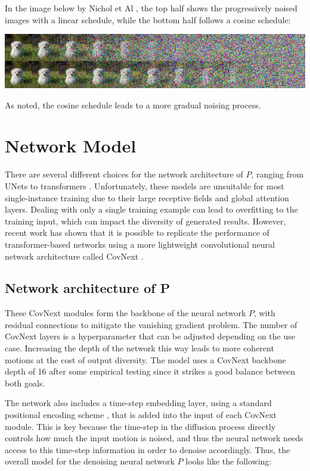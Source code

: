 \documentclass[a4paper, 12pt]{report}
\begin{document}
In the image below by Nichol et Al \cite{nichol_improved_2021}, the top half shows the progressively noised images with a linear schedule, while the bottom half follows a cosine schedule:

\includegraphics[width=\textwidth]{variance_schedule.jpeg}

As noted, the cosine schedule leads to a more gradual noising process.

\section{Network Model}

There are several different choices for the network architecture of \(P\), ranging from UNets \cite{ho_denoising_2020} to transformers \cite{tevet_human_2022}. Unfortunately, these models are unsuitable for most single-instance training due to their large receptive fields and global attention layers. Dealing with only a single training example can lead to overfitting to the training input, which can impact the diversity of generated results. However, recent work has shown that it is possible to replicate the performance of transformer-based networks using a more lightweight convolutional neural network architecture called CovNext \cite{liu_convnet_2022}. 

\subsection{Network architecture of P}
These CovNext modules form the backbone of the neural network \(P\), with residual connections to mitigate the vanishing gradient problem. The number of CovNext layers is a hyperparameter that can be adjusted depending on the use case. Increasing the depth of the network this way leads to more coherent motions at the cost of output diversity. The model uses a CovNext backbone depth of 16 after some empirical testing since it strikes a good balance between both goals.

The network also includes a time-step embedding layer, using a standard positional encoding scheme \cite{nikankin_sinfusion_2023}, that is added into the input of each CovNext module. This is key because the time-step in the diffusion process directly controls how much the input motion is noised, and thus the neural network needs access to this time-step information in order to denoise accordingly. Thus, the overall model for the denoising neural network \(P\) looks like the following:
\end{document}

